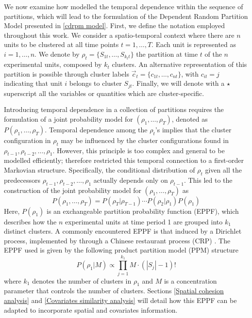 \documentclass[12pt,	%
	a4paper,		%
	twoside,		%
	openright,		%
	titlepage,%
	]{book}
\theoremstyle{definition}
\let\cite\citep
\begin{document}
We now examine how \cite{1-drpm} modelled the temporal dependence within the sequence of partitions, which will lead to the formulation of the Dependent Random Partition Model presented in \eqref{cdrpm model}.
First, we define the notation employed throughout this work. We consider a spatio-temporal context where there are $n$ units to be clustered at all time points $t=1,\ldots,T$. Each unit is represented as $i=1,\ldots,n$. We denote by $\rho_t=\{S_{1t}, \ldots, S_{k_tt}\}$ the partition at time $t$ of the $n$ experimental units, composed by $k_t$ clusters. An alternative representation of this partition is possible through cluster labels $\vec{c}_t = \{ c_{1t}, \ldots, c_{nt}\}$, with $c_{it}=j$ indicating that unit $i$ belongs to cluster $S_{jt}$. Finally, we will denote with a $\star$ superscript all the variables or quantities which are cluster-specific.

Introducing temporal dependence in a collection of partitions requires the formulation of a joint probability model for $(\rho_1, \ldots, \rho_T)$, denoted as $P(\rho_1, \ldots, \rho_T)$. Temporal dependence among the $\rho_t$’s implies that the cluster configuration in $\rho_t$ may be influenced by the cluster configurations found in $\rho_{t-1}, \rho_{t-2}, \ldots, \rho_1$. However, this principle is too complex and general to be modelled efficiently; therefore \cite{1-drpm} restricted this temporal connection to a first-order Markovian structure. Specifically, the conditional distribution of $\rho_t$ given all the predecessors $\rho_{t-1}, \rho_{t-2}, \ldots, \rho_1$ actually depends only on $\rho_{t-1}$. This led to the construction of the joint probability model for $(\rho_1, \ldots, \rho_T)$ as
\begin{equation}
P(\rho_1, \ldots, \rho_T) = P(\rho_T|\rho_{T-1}) \cdots P(\rho_2|\rho_1) P(\rho_1)
\label{P rhos 1}
\end{equation}
Here, $P(\rho_1)$ is an exchangeable partition probability function (EPPF), which describes how the $n$ experimental units at time period 1 are grouped into $k_1$ distinct clusters. A commonly encountered EPPF is that induced by a Dirichlet process, implemented by \cite{1-drpm} through a Chinese restaurant process (CRP) \cite{sample-size-consistency}. The EPPF used is given by the following product partition model (PPM) structure
\begin{equation}
    P(\rho_1|M) \propto \prod_{j=1}^{k_1} M\cdot(|S_j|-1)!
    \label{eppf rho1}
\end{equation}
where $k_1$ denotes the number of clusters in $\rho_1$ and $M$ is a concentration parameter that controls the number of clusters. Sections \ref{Spatial cohesion analysis} and \ref{Covariates similarity analysis} will detail how this EPPF can be adapted to incorporate spatial and covariates information.
\end{document}
